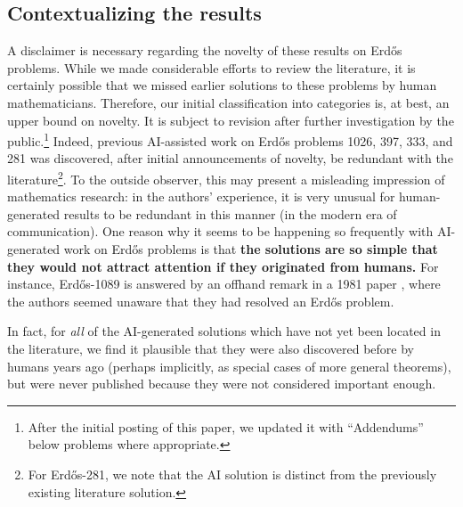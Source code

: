 \documentclass{article}
\theoremstyle{plain}
\theoremstyle{definition}
\begin{document}
\subsection{Contextualizing the results}\label{ssec:contextualizing} A disclaimer is necessary regarding the novelty of these results on Erd\H{o}s problems. While we made considerable efforts to review the literature, it is certainly possible that we missed earlier solutions to these problems by human mathematicians. Therefore, our initial classification into categories is, at best, an upper bound on novelty. It is subject to revision after further investigation by the public.\footnote{After the initial posting of this paper, we updated it with ``Addendums'' below problems where appropriate.} Indeed, previous AI-assisted work on Erd\H{o}s problems 1026, 397, 333, and 281 was discovered, after initial announcements of novelty, be redundant with the literature\footnote{For Erd\H{o}s-281, we note that the AI solution is distinct from the previously existing literature solution.}. To the outside observer, this may present a misleading impression of mathematics research: in the authors' experience, it is very unusual for human-generated results to be redundant in this manner (in the modern era of communication). One reason why it seems to be happening so frequently with AI-generated work on Erd\H{o}s problems is that \textbf{the solutions are so simple that they would not attract attention if they originated from humans.} For instance, Erd\H{o}s-1089 is answered by an offhand remark in a 1981 paper \cite{Bannai81}, where the authors seemed unaware that they had resolved an Erd\H{o}s problem. 

In fact, for \emph{all} of the AI-generated solutions which have not yet been located in the literature, we find it plausible that they were also discovered before by humans years ago (perhaps implicitly, as special cases of more general theorems), but were never published because they were not considered important enough. 
	
\end{document}

